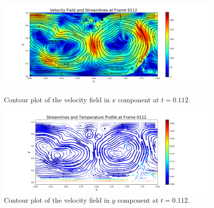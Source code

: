\documentclass[11pt]{article} %
\begin{document}
\begin{figure}[h!]
\centering
\hspace*{-0.25in}
\includegraphics[width=1.2\textwidth]{streamline_regular.png}
\caption{Contour plot of the velocity field in $x$ component at $t=0.112$.}
\hspace*{-0.25in}
\includegraphics[width=1.2\textwidth]{streamline.png}
\caption{Contour plot of the velocity field in $y$ component at $t=0.112$.}
\end{figure}
\newpage
\end{document}
